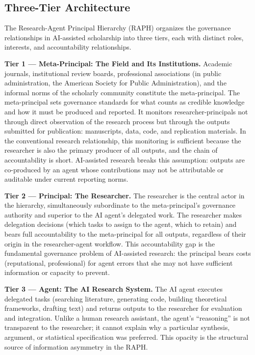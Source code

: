 \documentclass[12pt]{article}
\begin{document}
\subsection{Three-Tier Architecture}

The Research-Agent Principal Hierarchy (RAPH) organizes the governance relationships in
AI-assisted scholarship into three tiers, each with distinct roles, interests, and
accountability relationships.

\textbf{Tier 1 --- Meta-Principal: The Field and Its Institutions.}
Academic journals, institutional review boards, professional associations (in public
administration, the American Society for Public Administration), and the informal norms of
the scholarly community constitute the meta-principal. The meta-principal sets governance
standards for what counts as credible knowledge and how it must be produced and reported.
It monitors researcher-principals not through direct observation of the research process but
through the outputs submitted for publication: manuscripts, data, code, and replication
materials. In the conventional research relationship, this monitoring is sufficient because
the researcher is also the primary producer of all outputs, and the chain of accountability
is short. AI-assisted research breaks this assumption: outputs are co-produced by an agent
whose contributions may not be attributable or auditable under current reporting norms.

\textbf{Tier 2 --- Principal: The Researcher.}
The researcher is the central actor in the hierarchy, simultaneously subordinate to the
meta-principal's governance authority and superior to the AI agent's delegated work. The
researcher makes delegation decisions (which tasks to assign to the agent, which to retain)
and bears full accountability to the meta-principal for all outputs, regardless of their
origin in the researcher-agent workflow. This accountability gap is the fundamental governance
problem of AI-assisted research: the principal bears costs (reputational, professional) for
agent errors that she may not have sufficient information or capacity to prevent.

\textbf{Tier 3 --- Agent: The AI Research System.}
The AI agent executes delegated tasks (searching literature, generating code, building
theoretical frameworks, drafting text) and returns outputs to the researcher for evaluation
and integration. Unlike a human research assistant, the agent's ``reasoning'' is not
transparent to the researcher; it cannot explain why a particular synthesis, argument,
or statistical specification was preferred. This opacity is the structural source of
information asymmetry in the RAPH.
\end{document}
